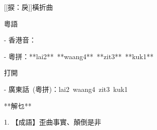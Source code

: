 
[[捩：戾]]橫折曲

粵語

  
- 香港音：

- 粵拼：**lai2** **waang4** **zit3** **kuk1**

打開

- 廣東話 (粵拼)：lai2 waang4 zit3 kuk1

**解乜**

1. 【成語】歪曲事實、顛倒是非